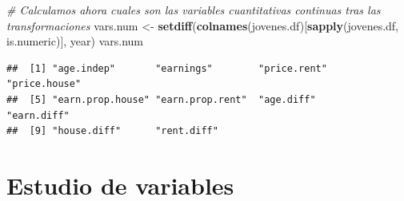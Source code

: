 \documentclass[water,article,submit,pdftex,moreauthors]{Definitions/mdpi}
\newenvironment{Shaded}{\begin{snugshade}}{\end{snugshade}}
\newcommand{\CommentTok}[1]{\textcolor[rgb]{0.56,0.35,0.01}{\textit{#1}}}
\newcommand{\FunctionTok}[1]{\textcolor[rgb]{0.13,0.29,0.53}{\textbf{#1}}}
\newcommand{\NormalTok}[1]{#1}
\newcommand{\OtherTok}[1]{\textcolor[rgb]{0.56,0.35,0.01}{#1}}
\newcommand{\StringTok}[1]{\textcolor[rgb]{0.31,0.60,0.02}{#1}}
\begin{document}
\begin{Shaded}
\begin{Highlighting}[]
\CommentTok{\# Calculamos ahora cuales son las variables cuantitativas continuas tras las transformaciones}
\NormalTok{vars.num }\OtherTok{\textless{}{-}} \FunctionTok{setdiff}\NormalTok{(}\FunctionTok{colnames}\NormalTok{(jovenes.df)[}\FunctionTok{sapply}\NormalTok{(jovenes.df, is.numeric)], }\StringTok{\textquotesingle{}year\textquotesingle{}}\NormalTok{)}
\NormalTok{vars.num}
\end{Highlighting}
\end{Shaded}

\begin{verbatim}
##  [1] "age.indep"       "earnings"        "price.rent"      "price.house"    
##  [5] "earn.prop.house" "earn.prop.rent"  "age.diff"        "earn.diff"      
##  [9] "house.diff"      "rent.diff"
\end{verbatim}

\section{Estudio de variables}\label{estudio-de-variables}
\end{document}
